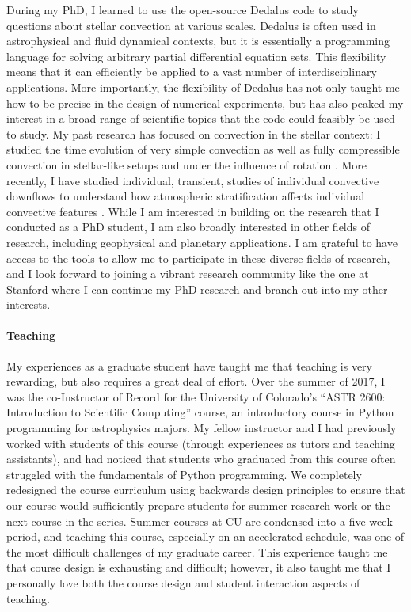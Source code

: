 \documentclass[aps, pre, onecolumn, nofootinbib, notitlepage, groupedaddress, amsfonts, amssymb, amsmath]{revtex4-1}
\begin{document}
During my PhD, I learned to use the open-source Dedalus \citep{burns&all2019} code to study questions about stellar convection at various scales.
Dedalus is often used in astrophysical and fluid dynamical contexts, but it is essentially a programming language for solving arbitrary partial differential equation sets.
This flexibility means that it can efficiently be applied to a vast number of interdisciplinary applications.
More importantly, the flexibility of Dedalus has not only taught me how to be precise in the design of numerical experiments, but has also peaked my interest in a broad range of scientific topics that the code could feasibly be used to study.
My past research has focused on convection in the stellar context: I studied the time evolution of very simple convection \citep{anders&all2018} as well as fully compressible convection in stellar-like setups \citep{anders&brown2017} and under the influence of rotation \citep{anders&all2019}.
More recently, I have studied individual, transient, studies of individual convective downflows to understand how atmospheric stratification affects individual convective features \citep{andersLB2019}.
While I am interested in building on the research that I conducted as a PhD student, I am also broadly interested in other fields of research, including geophysical and planetary applications.
I am grateful to have access to the tools to allow me to participate in these diverse fields of research, and I look forward to joining a vibrant research community like the one at Stanford where I can continue my PhD research and branch out into my other interests.

\paragraph*{Teaching}
My experiences as a graduate student have taught me that teaching is very rewarding, but also requires a great deal of effort.
Over the summer of 2017, I was the co-Instructor of Record for the University of Colorado's ``ASTR 2600: Introduction to Scientific Computing'' course, an introductory course in Python programming for astrophysics majors.
My fellow instructor and I had previously worked with students of this course (through experiences as tutors and teaching assistants), and had noticed that students who graduated from this course often struggled with the fundamentals of Python programming.
We completely redesigned the course curriculum using backwards design principles to ensure that our course would sufficiently prepare students for summer research work or the next course in the series.
Summer courses at CU are condensed into a five-week period, and teaching this course, especially on an accelerated schedule, was one of the most difficult challenges of my graduate career.
This experience taught me that course design is exhausting and difficult; however, it also taught me that I personally love both the course design and student interaction aspects of teaching.
\end{document}
